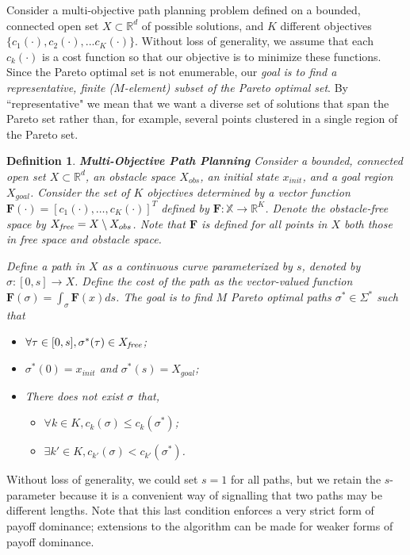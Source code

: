 \documentclass{article}
\newtheorem{defn}{Definition}
\begin{document}
Consider a multi-objective path planning problem defined on a bounded, connected open set $X\subset\mathbb{R}^d$ of possible solutions, and $K$ different objectives $\{c_{1}(\cdot), c_{2}(\cdot), ... c_{K}(\cdot)\}$. 
Without loss of generality, we assume that each $c_{k}(\cdot)$ is a cost function so that our objective is to minimize these functions.  
Since the Pareto optimal set is not enumerable, our {\em goal is to find a representative, finite ($M$-element) subset of the Pareto optimal set}.  
By ``representative" we mean that we want a diverse set of solutions that span the Pareto set rather than, for example, several points clustered in a single region of the Pareto set.  

\begin{defn}{ \textbf{Multi-Objective Path Planning} }
Consider a bounded, connected open set $ X \subset \mathbb{R}^{d} $, an obstacle space $ X_{obs} $, an initial state $ x_{init} $, and a goal region $ X_{goal} $. 
Consider the set of $K$ objectives determined by a vector function $ \bm{F}(\cdot) = [ c_{1} (\cdot), \ldots , c_{K}(\cdot) ]^{T}$ defined by $\bm{F}: \mathbb X \rightarrow \mathbb{R}^{K} $. 
Denote the obstacle-free space by $ X_{\it free} = X \setminus X_{obs} $. Note that $\bm{F}$ is defined for all points in $X$ both those in free space and obstacle space.

Define a {\em path} in $X$ as a continuous curve parameterized by $s$, denoted by $\sigma : [0,s] \rightarrow X$. 
Define the cost of the path as the vector-valued function $ \bm{F}(\sigma) = \int_{\sigma} \bm{F}(x)ds $.  
The goal is to find $ M $ Pareto optimal paths $ \sigma^{*} \in \Sigma^{*}$ such that
\begin{itemize}
	\item $\forall \tau\in[0,s], \sigma^*(\tau) \in X_{\it free}$;
	\item $ \sigma^{*} (0) = x_{init} $ and $ \sigma^{*} (s) = X_{goal}  $;
	\item There does not exist $ \sigma $ that,
	\begin{itemize}
		\item $ \forall k \in K, c_{k} (\sigma) \leq c_{k} (\sigma^{*}) $;
		\item $ \exists k' \in K, c_{k'} (\sigma) < c_{k'} (\sigma^{*}) $.
	\end{itemize}
\end{itemize}
\end{defn}
\noindent Without loss of generality, we could set $s=1$ for all paths, but we retain the $s$-parameter because it is a convenient way of signalling that two paths may be different lengths.  Note that this last condition enforces a very strict form of payoff dominance; extensions to the algorithm can be made for weaker forms of payoff dominance.
\end{document}

